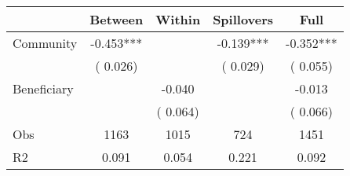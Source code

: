 
\begin{tabular}{l*{4}{c}}\hline&\multicolumn{1}{c}{Between}&\multicolumn{1}{c}{Within}&\multicolumn{1}{c}{Spillovers}&\multicolumn{1}{c}{Full}\\ \hline
 Community             &             -0.453***      &                                               &       -0.139*** &        -0.352***                            \\ 
                               &        (       0.026)           &                                       &       (       0.029)     &      (       0.055)                                           \\ 
 Beneficiary   &                                               &       -0.040    &                                &            -0.013                            \\ 
                               &                                               & (       0.064)                  &                                        &      (       0.066)                                           \\ 
\hline                                                                                                                                                                                                                                            
 Obs                   &               1163               &       1015                       &       724                &              1451                                               \\ 
 R2                    &                      0.091              &              0.054                      &              0.221               &                     0.092                                              \\ 
\hline \end{tabular}                                                                                                                                                                                                              
